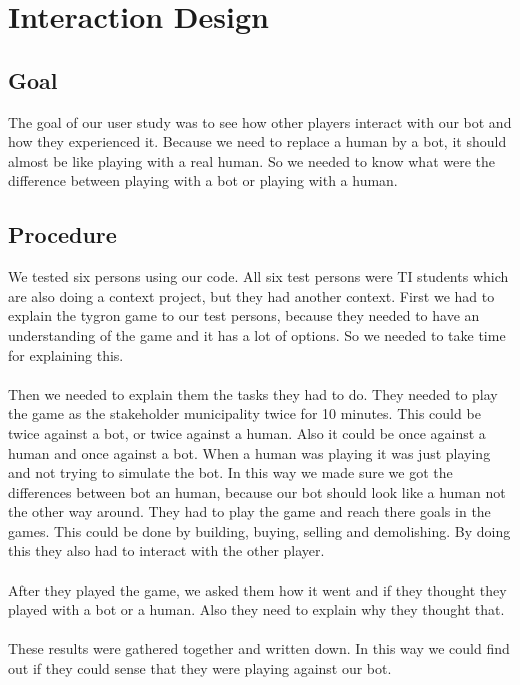 \section{Interaction Design}

\subsection{Goal}
The goal of our user study was to see how other players interact with our bot and how they experienced it. Because we need to replace a human by a bot, it should almost be like playing with a real human. So we needed to know what were the difference between playing with a bot or playing with a human.

\subsection{Procedure}
We tested six persons using our code.  All six test persons were TI students which are also doing a context project, but they had another context.  
First we had to explain the tygron game to our test persons, because they needed to have an understanding of the game and it has a lot of options. So we needed to take time for explaining this. 
\\ \\
Then we needed to explain them the tasks they had to do. They needed to play the game as the stakeholder municipality twice for 10 minutes. This could be twice against a bot, or twice against a human. Also it could be once against a human and once against a bot. When a human was playing it was just playing and not trying to simulate the bot. In this way we made sure we got the differences between bot an human, because our bot should look like a human not the other way around. They had to play the game and reach there goals in the games. This could be done by building, buying, selling and demolishing. By doing this they also had to interact with the other player. 
\\ \\
After they played the game, we asked them how it went and if they thought they played with a bot or a human. Also they need to explain why they thought that. 
\\ \\
These results were gathered together and written down. In this way we could find out if they could sense that they were playing against our bot.
